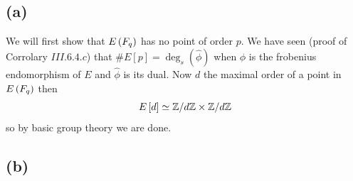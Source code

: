 \documentclass[../main.tex]{subfiles}
\begin{document}
\subsection{(a)}
We will first show that $E\left( F_q \right)$ has no point of order $p$.
We have seen (proof of Corrolary $III.6.4.c$) that $\#E\left[ p \right] = \deg_s\left( \hat{\phi} \right)$ when $\phi$ is the frobenius endomorphism of $E$ and $\hat{\phi}$ is its dual.
Now $d$ the maximal order of a point in $E\left( F_q \right)$ then 
\[
  E\left[ d \right] \simeq \mathbb{Z}/d\mathbb{Z} \times \mathbb{Z}/d\mathbb{Z}
\]
so by basic group theory we are done.

\subsection{(b)}
\end{document}

